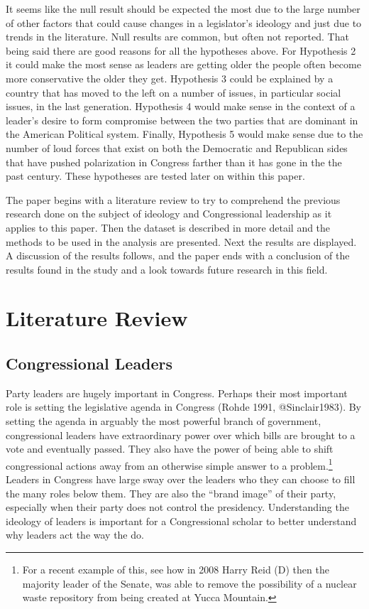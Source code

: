 \documentclass[12pt,twoside]{reedthesis}
\begin{document}
  It seems like the null result should be expected the most due to the
  large number of other factors that could cause changes in a legislator's
  ideology and just due to trends in the literature. Null results are
  common, but often not reported. That being said there are good reasons
  for all the hypotheses above. For Hypothesis 2 it could make the most
  sense as leaders are getting older the people often become more
  conservative the older they get. Hypothesis 3 could be explained by a
  country that has moved to the left on a number of issues, in particular
  social issues, in the last generation. Hypothesis 4 would make sense in
  the context of a leader's desire to form compromise between the two
  parties that are dominant in the American Political system. Finally,
  Hypothesis 5 would make sense due to the number of loud forces that
  exist on both the Democratic and Republican sides that have pushed
  polarization in Congress farther than it has gone in the the past
  century. These hypotheses are tested later on within this paper.
  
  The paper begins with a literature review to try to comprehend the
  previous research done on the subject of ideology and Congressional
  leadership as it applies to this paper. Then the dataset is described in
  more detail and the methods to be used in the analysis are presented.
  Next the results are displayed. A discussion of the results follows, and
  the paper ends with a conclusion of the results found in the study and a
  look towards future research in this field.
  
  \chapter{Literature Review}\label{literature-review}
  
  \section{Congressional Leaders}\label{congressional-leaders}
  
  Party leaders are hugely important in Congress. Perhaps their most
  important role is setting the legislative agenda in Congress (Rohde
  1991, @Sinclair1983). By setting the agenda in arguably the most
  powerful branch of government, congressional leaders have extraordinary
  power over which bills are brought to a vote and eventually passed. They
  also have the power of being able to shift congressional actions away
  from an otherwise simple answer to a problem.\footnote{For a recent
    example of this, see how in 2008 Harry Reid (D) then the majority
    leader of the Senate, was able to remove the possibility of a nuclear
    waste repository from being created at Yucca Mountain.} Leaders in
  Congress have large sway over the leaders who they can choose to fill
  the many roles below them. They are also the ``brand image'' of their
  party, especially when their party does not control the presidency.
  Understanding the ideology of leaders is important for a Congressional
  scholar to better understand why leaders act the way the do.
  
\end{document}
